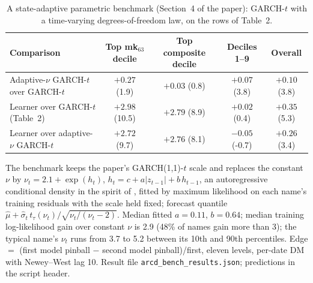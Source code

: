 \documentclass[11pt]{article}
\begin{document}
\begin{table}[htbp]
\centering
\begin{threeparttable}
\caption{A state-adaptive parametric benchmark (Section~4 of the paper): GARCH-$t$ with a time-varying degrees-of-freedom law, on the rows of Table~2.}
\label{tab:arcd}
\scriptsize\setlength{\tabcolsep}{4pt}
\begin{tabular}{lcccc}
\toprule
Comparison & Top mk$_{63}$ decile & Top composite decile & Deciles 1--9 & Overall \\
\midrule
Adaptive-$\nu$ GARCH-$t$ over GARCH-$t$ & $+0.27$ (1.9) & $+0.03$ (0.8) & $+0.07$ (3.8) & $+0.10$ (3.8) \\
Learner over GARCH-$t$ (Table~2) & $+2.98$ (10.5) & $+2.79$ (8.9) & $+0.02$ (0.4) & $+0.35$ (5.3) \\
Learner over adaptive-$\nu$ GARCH-$t$ & $+2.72$ (9.7) & $+2.76$ (8.1) & $-0.05$ (-0.7) & $+0.26$ (3.4) \\
\bottomrule
\end{tabular}
\begin{tablenotes}\footnotesize
\item The benchmark keeps the paper's GARCH(1,1)-$t$ scale and replaces the constant $\nu$ by $\nu_t = 2.1 + \exp(h_t)$, $h_t = c + a|z_{t-1}| + b\,h_{t-1}$, an autoregressive conditional density in the spirit of \citet{hansen1994ARCD}, fitted by maximum likelihood on each name's training residuals with the scale held fixed; forecast quantile $\widehat\mu + \widehat\sigma_t\, t_\tau(\nu_t)/\sqrt{\nu_t/(\nu_t-2)}$. Median fitted $a = 0.11$, $b = 0.64$; median training log-likelihood gain over constant $\nu$ is 2.9 (48\% of names gain more than 3); the typical name's $\nu_t$ runs from 3.7 to 5.2 between its 10th and 90th percentiles. Edge $=$ (first model pinball $-$ second model pinball)/first, eleven levels, per-date DM with Newey--West lag 10. Result file \texttt{arcd\_bench\_results.json}; predictions in the script header.
\end{tablenotes}
\end{threeparttable}
\end{table}
\end{document}
